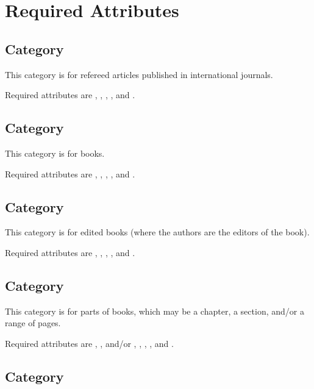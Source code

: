 
\section{Required Attributes}

\subsection{Category }

This category is for refereed articles published in international
journals.

Required attributes are , , , , and .

\subsection{Category }

This category is for books.

Required attributes are , , , , and .

\subsection{Category }

This category is for edited books (where the authors are the editors of
the book).

Required attributes are , , , , and .

\subsection{Category }

This category is for parts of books, which may be a chapter, a
section, and/or a range of pages.

Required attributes are , , 
and/or , , , , and
.

\subsection{Category }

